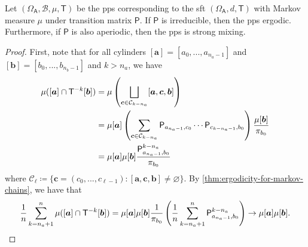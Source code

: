 \documentclass[a4paper]{article}
\begin{document}
\begin{corollary}\label{cor:ireeducible-iff-ergodicity}
	Let $(\Omega_{\mathsf{A}},\mathcal{B},\mu,\mathsf{T})$ be the \gls{pps} corresponding to
	the \gls{sft} $(\Omega_{\mathsf{A}},d,\mathsf{T})$
	with Markov measure $\mu$ under transition matrix $\mathsf{P}$.
	If $\mathsf{P}$ is irreducible, then the \gls{pps} ergodic.
	Furthermore, if $\mathsf{P}$ is also aperiodic, then the \gls{pps} is strong mixing.
\end{corollary}
\begin{proof}
	First, note that
	for all cylinders $[\boldsymbol{a}]=[a_0,...,a_{n_a-1}]$ and $[\boldsymbol{b}]=[b_{0},...,b_{n_b-1}]$ and $k>n_a$,
	we have
	\begin{align}
		\mu([\boldsymbol{a}]\cap\mathsf{T}\inv[k][\boldsymbol{b}])
		&= \mu\left(\bigsqcup_{\boldsymbol{c}\in\mathcal{C}_{k-n_a}}[\boldsymbol{a},\boldsymbol{c},\boldsymbol{b}]\right) \nonumber\\
		&= \mu[\boldsymbol{a}]
		\left( \sum_{\boldsymbol{c}\in\mathcal{C}_{k-n_a}} \mathsf{P}_{a_{n_a-1},c_0}\cdots\mathsf{P}_{c_{k-n_a-1},b_0} \right)
		\frac{ \mu[\boldsymbol{b}] }{ \pi_{b_0} } \nonumber\\
		&= \mu[\boldsymbol{a}] \mu[\boldsymbol{b}] \frac{ \mathsf{P}_{a_{n_a-1},b_0}^{k-n_a} }{ \pi_{b_0} }
		\label{eq:cylinders-rearrange}
	\end{align}
	where $\mathcal{C}_{\ell} \coloneqq \{\boldsymbol{c}=(c_0,...,c_{\ell-1}):[\boldsymbol{a},\boldsymbol{c},\boldsymbol{b}]\neq\varnothing\}$.
	By \autoref{thm:ergodicity-for-markov-chains}, we have that
	\begin{align*}
		\frac1n \sum_{k=n_a+1}^{n} \mu([\boldsymbol{a}]\cap\mathsf{T}\inv[k][\boldsymbol{b}])
		= \mu[\boldsymbol{a}] \mu[\boldsymbol{b}] \frac1{\pi_{b_0}} \left( \frac1n\sum_{k=n_a+1}^{n} \mathsf{P}_{a_{n_a-1},b_0}^{k-n_a} \right)
		\to \mu[\boldsymbol{a}] \mu[\boldsymbol{b}].
	\end{align*}


\end{proof}
\end{document}
